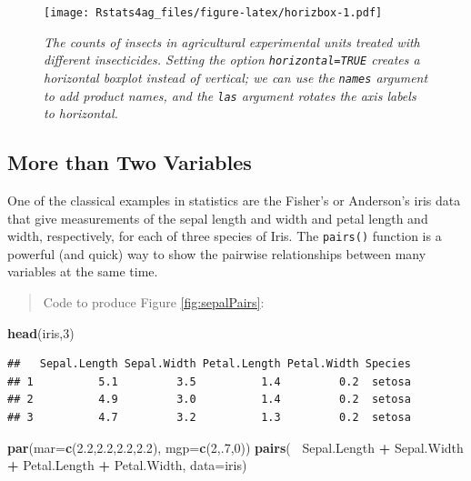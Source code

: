\documentclass[letterpaper,]{book}
\newenvironment{Shaded}{\begin{snugshade}}{\end{snugshade}}
\newcommand{\DataTypeTok}[1]{\textcolor[rgb]{0.13,0.29,0.53}{#1}}
\newcommand{\DecValTok}[1]{\textcolor[rgb]{0.00,0.00,0.81}{#1}}
\newcommand{\FloatTok}[1]{\textcolor[rgb]{0.00,0.00,0.81}{#1}}
\newcommand{\KeywordTok}[1]{\textcolor[rgb]{0.13,0.29,0.53}{\textbf{#1}}}
\newcommand{\NormalTok}[1]{#1}
\newcommand{\OperatorTok}[1]{\textcolor[rgb]{0.81,0.36,0.00}{\textbf{#1}}}
\newcommand{\StringTok}[1]{\textcolor[rgb]{0.31,0.60,0.02}{#1}}
\begin{document}
\begin{figure}
\centering
\texttt{[image: Rstats4ag\_files/figure-latex/horizbox-1.pdf]}
\caption{\label{fig:horizbox}\emph{The counts of insects in agricultural experimental units treated with different insecticides. Setting the option \texttt{horizontal=TRUE} creates a horizontal boxplot instead of vertical; we can use the \texttt{names} argument to add product names, and the \texttt{las} argument rotates the axis labels to horizontal.}}
\end{figure}

\hypertarget{more-than-two-variables}{%
\subsection{More than Two Variables}\label{more-than-two-variables}}

One of the classical examples in statistics are the Fisher's or Anderson's iris data that give measurements of the sepal length and width and petal length and width, respectively, for each of three species of Iris. The \texttt{pairs()} function is a powerful (and quick) way to show the pairwise relationships between many variables at the same time.

\begin{quote}
Code to produce Figure \ref{fig:sepalPairs}:
\end{quote}

\begin{Shaded}
\begin{Highlighting}[]
\KeywordTok{head}\NormalTok{(iris,}\DecValTok{3}\NormalTok{)}
\end{Highlighting}
\end{Shaded}

\begin{verbatim}
##   Sepal.Length Sepal.Width Petal.Length Petal.Width Species
## 1          5.1         3.5          1.4         0.2  setosa
## 2          4.9         3.0          1.4         0.2  setosa
## 3          4.7         3.2          1.3         0.2  setosa
\end{verbatim}

\begin{Shaded}
\begin{Highlighting}[]
\KeywordTok{par}\NormalTok{(}\DataTypeTok{mar=}\KeywordTok{c}\NormalTok{(}\FloatTok{2.2}\NormalTok{,}\FloatTok{2.2}\NormalTok{,}\FloatTok{2.2}\NormalTok{,}\FloatTok{2.2}\NormalTok{), }\DataTypeTok{mgp=}\KeywordTok{c}\NormalTok{(}\DecValTok{2}\NormalTok{,.}\DecValTok{7}\NormalTok{,}\DecValTok{0}\NormalTok{))}
\KeywordTok{pairs}\NormalTok{(}\OperatorTok{~}\StringTok{ }\NormalTok{Sepal.Length }\OperatorTok{+}\StringTok{ }\NormalTok{Sepal.Width }\OperatorTok{+}\StringTok{ }\NormalTok{Petal.Length }\OperatorTok{+}\StringTok{ }\NormalTok{Petal.Width, }\DataTypeTok{data=}\NormalTok{iris)}
\end{Highlighting}
\end{Shaded}
\end{document}
